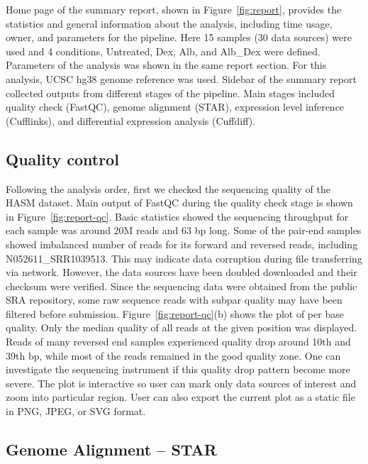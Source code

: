 

Home page of the summary report, shown in Figure~\ref{fig:report}, provides the
statistics and general information about the analysis, including time usage,
owner, and parameters for the pipeline. Here 15 samples (30 data sources) were
used and 4 conditions, Untreated, Dex, Alb, and Alb\_Dex were defined.
Parameters of the analysis was shown in the same report section. For this
analysis, UCSC hg38 genome reference was used. Sidebar of the summary report
collected outputs from different stages of the pipeline. Main stages included
quality check (FastQC), genome alignment (STAR), expression level inference
(Cufflinks), and differential expression analysis (Cuffdiff).


\subsection{Quality control}



Following the analysis order, first we checked the sequencing quality of the
HASM dataset. Main output of FastQC during the quality check stage is shown in
Figure~\ref{fig:report-qc}. Basic statistics showed the sequencing throughput
for each sample was around 20M reads and 63 bp long. Some of the pair-end
samples showed imbalanced number of reads for its forward and reversed reads,
including N052611\_SRR1039513. This may indicate data corruption during file
transferring via network. However, the data sources have been doubled
downloaded and their checksum were verified. Since the sequencing data were
obtained from the public SRA repository, some raw sequence reads with subpar
quality may have been filtered before submission. Figure~\ref{fig:report-qc}(b)
shows the plot of per base quality.  Only the median quality of all reads at
the given position was displayed. Reads of many reversed end samples
experienced quality drop around 10th and 39th bp, while most of the reads
remained in the good quality zone. One can investigate the sequencing
instrument if this quality drop pattern become more severe. The plot is
interactive so user can mark only data sources of interest and zoom into
particular region.  User can also export the current plot as a static file in
PNG, JPEG, or SVG format.


\subsection{Genome Alignment -- STAR}

